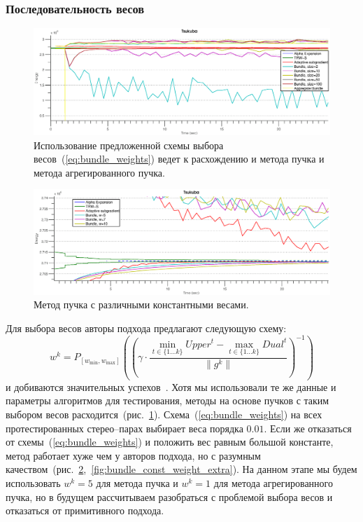 \documentclass{article}
\begin{document}
\subsubsection{Последовательность весов}
\begin{figure}[t]
  \includegraphics[width=1.1\textwidth]{bundle_weights_problem_tsukuba.eps}
  \caption{Использование предложенной схемы выбора весов~(\ref{eq:bundle_weights}) ведет к расхождению и метода пучка и метода агрегированного пучка.}
  \label{fig:bundle_weights_problem}
\end{figure}

\begin{figure}[t]
  \includegraphics[width=1.1\textwidth]{bundle_const_weight_tsukuba.eps}
  \caption{Метод пучка с различными константными весами.}
  \label{fig:bundle_const_weight}
\end{figure}

Для выбора весов авторы подхода предлагают следующую схему:\\
\begin{equation}
   w^k = P_{[w_\text{min}, w_\text{max}]} \left ( \left (\gamma \cdot \frac{\min_{t \in \{1 \dots k\}}Upper^t - \max_{t \in \{1 \dots k\}} Dual^t}{\left \| g^k \right \|} \right )^{-1}\right )
   \label{eq:bundle_weights}
\end{equation}
и добиваются значительных успехов~\cite{Bundle}. Хотя мы использовали те же данные и параметры алгоритмов для тестирования, методы на основе пучков с таким выбором весов расходится~(рис.~\ref{fig:bundle_weights_problem}). Схема~(\ref{eq:bundle_weights}) на всех протестированных стерео--парах выбирает веса порядка $0.01$. Если же отказаться от схемы~(\ref{eq:bundle_weights}) и положить вес равным большой константе, метод работает хуже чем у авторов подхода, но с разумным качеством~(рис.~\ref{fig:bundle_const_weight},~\ref{fig:bundle_const_weight_extra}). На данном этапе мы будем использовать $w^k = 5$ для метода пучка и $w^k = 1$ для метода агрегированного пучка, но в будущем рассчитываем разобраться с проблемой выбора весов и отказаться от примитивного подхода.
\end{document}

